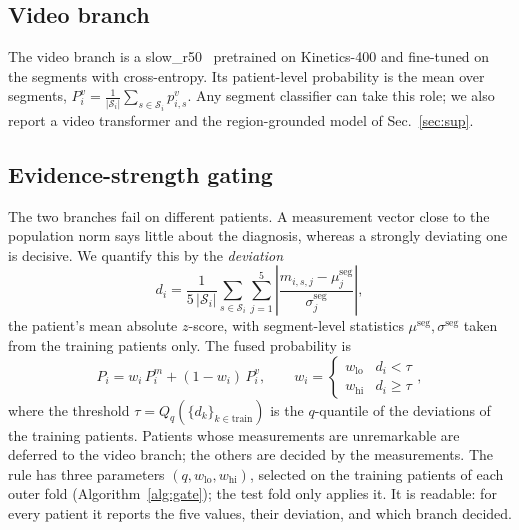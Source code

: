 \subsection{Video branch}
\label{sec:video}

The video branch is a slow\_r50~\cite{TODO_slowfast} pretrained on Kinetics-400 and fine-tuned
on the segments with cross-entropy. Its patient-level probability is the mean over segments,
$P^{v}_i=\frac{1}{|\mathcal{S}_i|}\sum_{s\in\mathcal{S}_i}p^{v}_{i,s}$. Any segment classifier can
take this role; we also report a video transformer and the region-grounded model of
Sec.~\ref{sec:sup}.

\subsection{Evidence-strength gating}
\label{sec:gate}

The two branches fail on different patients. A measurement vector close to the population
norm says little about the diagnosis, whereas a strongly deviating one is decisive. We
quantify this by the \emph{deviation}
\begin{equation}
d_i=\frac{1}{5\,|\mathcal{S}_i|}\sum_{s\in\mathcal{S}_i}\sum_{j=1}^{5}
\left|\frac{m_{i,s,j}-\mu^{\mathrm{seg}}_j}{\sigma^{\mathrm{seg}}_j}\right| ,
\label{eq:dev}
\end{equation}
the patient's mean absolute $z$-score, with segment-level statistics
$\mu^{\mathrm{seg}},\sigma^{\mathrm{seg}}$ taken from the training patients only. The fused
probability is
\begin{equation}
P_i=w_i\,P^{m}_i+(1-w_i)\,P^{v}_i,\qquad
w_i=\begin{cases} w_{\mathrm{lo}} & d_i<\tau\\ w_{\mathrm{hi}} & d_i\ge\tau\end{cases},
\label{eq:gate}
\end{equation}
where the threshold $\tau=Q_q(\{d_k\}_{k\in\mathrm{train}})$ is the $q$-quantile of the deviations of the training patients. Patients whose measurements are unremarkable are deferred to
the video branch; the others are decided by the measurements. The rule has three parameters
$(q,w_{\mathrm{lo}},w_{\mathrm{hi}})$, selected on the training patients of each outer fold
(Algorithm~\ref{alg:gate}); the test fold only applies it. It is readable: for every patient
it reports the five values, their deviation, and which branch decided.

